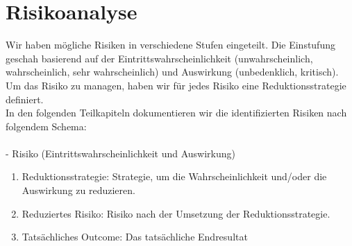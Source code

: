 \chapter{Risikoanalyse}
Wir haben mögliche Risiken in verschiedene Stufen eingeteilt.
Die Einstufung geschah basierend auf der Eintrittswahrscheinlichkeit (unwahrscheinlich, wahrscheinlich, sehr wahrscheinlich) und Auswirkung (unbedenklich, kritisch). 
Um das Risiko zu managen, haben wir für jedes Risiko eine Reduktionsstrategie definiert.\\
In den folgenden Teilkapiteln dokumentieren wir die identifizierten Risiken nach folgendem Schema:\\
\\
- Risiko (Eintrittswahrscheinlichkeit und Auswirkung)
\begin{enumerate}
    \item Reduktionsstrategie: Strategie, um die Wahrscheinlichkeit und/oder die Auswirkung zu reduzieren.
    \item Reduziertes Risiko: Risiko nach der Umsetzung der Reduktionsstrategie.
    \item Tatsächliches Outcome: Das tatsächliche Endresultat
\end{enumerate}

